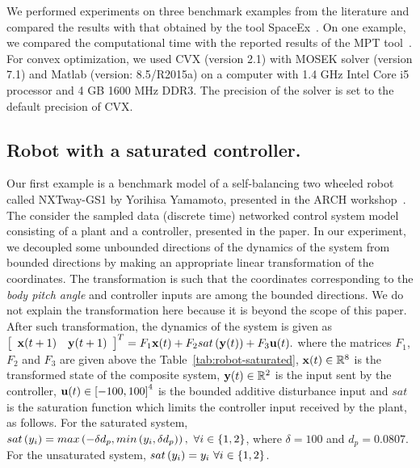 We performed experiments on three benchmark examples from the literature
and compared the results with that obtained by the tool
SpaceEx~\cite{FLD+11}. On one example, we compared the computational
time with the reported results of the MPT
tool~\cite{rakovic2004computation}.  For convex optimization, we used
CVX (version 2.1) with MOSEK solver (version 7.1) and Matlab (version:
8.5/R2015a) on a computer with 1.4 GHz Intel Core i5 processor and 4 GB
1600 MHz DDR3.  The precision of the solver is set to the default
precision of CVX.


\subsection{Robot with a saturated controller.}  Our first example is a benchmark
model of a self-balancing two wheeled robot called NXTway-GS1 by
Yorihisa Yamamoto, presented in the ARCH
workshop~\cite{heinz2014benchmark}.  The consider the sampled data
(discrete time) networked control system model consisting of a plant
and a controller, presented in the paper. In our experiment, we
decoupled some unbounded directions of the dynamics of the system from
bounded directions by making an appropriate linear transformation of
the coordinates.  The transformation is such that the coordinates
corresponding to the \emph{body pitch angle} and controller inputs are
among the bounded directions.  We do not explain the transformation
here because it is beyond the scope of this paper.  After such
transformation, the dynamics of the system is given as $
\left[\begin{array}{cc}{\bf x}(t+1) &
    {\bf y}(t+1)\end{array}\right]^T=F_1{\bf x}(t)+F_2sat\left({\bf y}(t)\right)+F_3{\bf u}(t).$
where the matrices $F_1$, $F_2$ and $F_3$ are given above the
Table~\ref{tab:robot-saturated}, ${\bf x}(t)\in\mathbb{R}^8$ is the
transformed state of the composite system, ${\bf y}(t)\in\mathbb{R}^2$
is the input sent by the controller, ${\bf u}(t)\in\left[-100,100\right]^4$
is the bounded additive disturbance input and $sat$ is the saturation
function which limits the controller input received by the plant, as
follows.  For the saturated system, $sat\left(y_i\right) = max\left(-\delta
d_p,min\left(y_i,\delta d_p\right)\right),~\forall i\in\{1,2\}$, where $\delta=100$
and $d_p=0.0807$.  For the unsaturated system,
$sat\left(y_i\right)=y_i~\forall i\in\{1,2\}$.
%

